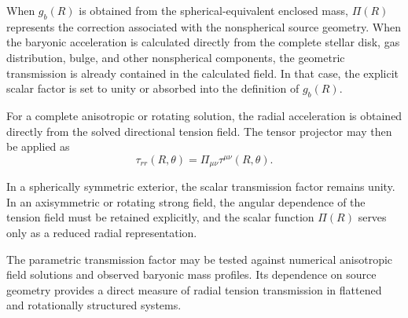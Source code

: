 When $g_b(R)$ is obtained from the spherical-equivalent enclosed mass, $\Pi(R)$ represents the correction associated with the nonspherical source geometry. When the baryonic acceleration is calculated directly from the complete stellar disk, gas distribution, bulge, and other nonspherical components, the geometric transmission is already contained in the calculated field. In that case, the explicit scalar factor is set to unity or absorbed into the definition of $g_b(R)$.

For a complete anisotropic or rotating solution, the radial acceleration is obtained directly from the solved directional tension field. The tensor projector may then be applied as
\begin{equation}
    \tau_{rr}(R,\theta) = \Pi_{\mu\nu} \tau^{\mu\nu}(R,\theta).
\end{equation}

In a spherically symmetric exterior, the scalar transmission factor remains unity. In an axisymmetric or rotating strong field, the angular dependence of the tension field must be retained explicitly, and the scalar function $\Pi(R)$ serves only as a reduced radial representation.

The parametric transmission factor may be tested against numerical anisotropic field solutions and observed baryonic mass profiles. Its dependence on source geometry provides a direct measure of radial tension transmission in flattened and rotationally structured systems.
